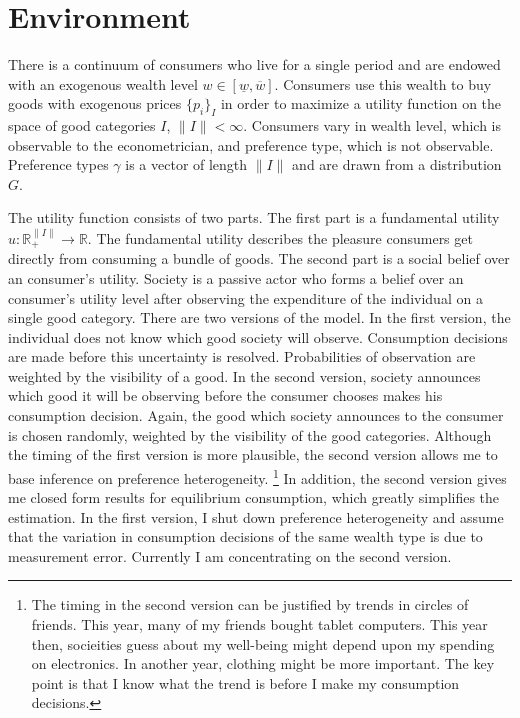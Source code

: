 \documentclass{article}
\begin{document}
\section{Environment}
There is a continuum of consumers who live for a single period and are endowed with an exogenous wealth level $w \in \left[ \underline{w},\overline{w} \right]$.
Consumers use this wealth to buy goods with exogenous prices $\{p_i\}_I$ in order to maximize a utility function on the space of good categories $I$, $\|I\|<\infty$. 
Consumers vary in wealth level, which is observable to the econometrician, and preference type, which is not observable.
Preference types $\gamma$ is a vector of length $\|I\|$ and are drawn from a distribution $G$.

The utility function consists of two parts.  The first part is a fundamental utility $u:\mathbb{R}_+^{\|I\|}\rightarrow\mathbb{R}$.
The fundamental utility describes the pleasure consumers get directly from consuming a bundle of goods.
The second part is a social belief over an consumer's utility.  
Society is a passive actor who forms a belief over an consumer's utility level after observing the expenditure of the individual on a single good category. 
There are two versions of the model.
In the first version, the individual does not know which good society will observe. 
Consumption decisions are made before this uncertainty is resolved.
Probabilities of observation are weighted by the visibility of a good.
In the second version, society announces which good it will be observing before the consumer chooses makes his consumption decision. 
Again, the good which society announces to the consumer is chosen randomly, weighted by the visibility of the good categories.
Although the timing of the first version is more plausible, the second version allows me to base inference on preference heterogeneity.
\footnote{The timing in the second version can be justified by trends in circles of friends.  This year, many of my friends bought tablet computers.  This year then, socieities guess about my well-being might depend upon my spending on electronics.  In another year, clothing might be more important.  The key point is that I know what the trend is before I make my consumption decisions.} 
In addition, the second version gives me closed form results for equilibrium consumption, which greatly simplifies the estimation.
In the first version, I shut down preference heterogeneity and assume that the variation in consumption decisions of the same wealth type is due to measurement error.
Currently I am concentrating on the second version.
\end{document}
